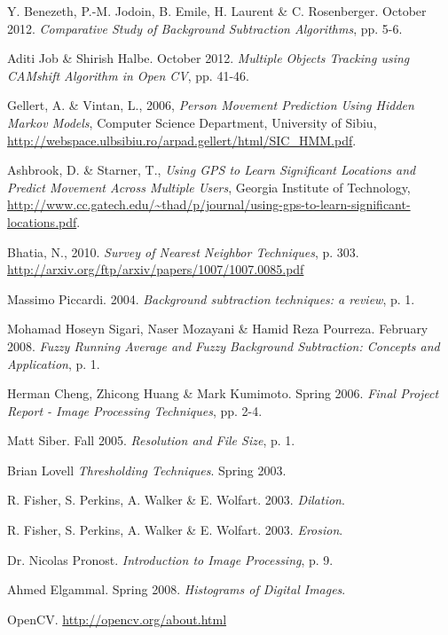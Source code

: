 \begin{thebibliography}{}

 Y. Benezeth, P.-M. Jodoin, B. Emile, H. Laurent \& C. Rosenberger. October 2012. \emph{Comparative Study of Background Subtraction Algorithms}, pp. 5-6.

 Aditi Job \& Shirish Halbe. October 2012. \emph{Multiple Objects Tracking using CAMshift Algorithm in Open CV}, pp. 41-46.

 Gellert, A. \& Vintan, L., 2006, \emph{Person Movement Prediction Using Hidden Markov Models}, Computer Science Department, University of Sibiu, \url{http://webspace.ulbsibiu.ro/arpad.gellert/html/SIC_HMM.pdf}.

 Ashbrook, D. \& Starner, T., \emph{Using GPS to Learn Significant Locations and Predict Movement Across Multiple Users}, Georgia Institute of Technology, \url{http://www.cc.gatech.edu/~thad/p/journal/using-gps-to-learn-significant-locations.pdf}.


 Bhatia, N., 2010. \emph{Survey of Nearest Neighbor Techniques}, p. 303. \url{http://arxiv.org/ftp/arxiv/papers/1007/1007.0085.pdf}


 Massimo Piccardi. 2004. \emph{Background subtraction techniques: a review}, p. 1.

 Mohamad Hoseyn Sigari, Naser Mozayani \& Hamid Reza Pourreza. February 2008. \emph{Fuzzy Running Average and Fuzzy Background Subtraction: Concepts and Application}, p. 1.

 Herman Cheng, Zhicong Huang \& Mark Kumimoto. Spring 2006. \emph{Final Project Report - Image Processing Techniques}, pp. 2-4.

 Matt Siber. Fall 2005. \emph{Resolution and File Size}, p. 1.

 Brian Lovell \emph{Thresholding Techniques}. Spring 2003.

 R. Fisher, S. Perkins, A. Walker \& E. Wolfart. 2003. \emph{Dilation}.

 R. Fisher, S. Perkins, A. Walker \& E. Wolfart. 2003. \emph{Erosion}.

 Dr. Nicolas Pronost. \emph{Introduction to Image Processing}, p. 9.

 Ahmed Elgammal. Spring 2008. \emph{Histograms of Digital Images}.


 OpenCV. \url{http://opencv.org/about.html}






\end{thebibliography}